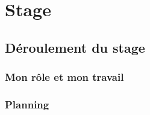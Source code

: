 \chapter{Stage}

\section{Déroulement du stage} %

\subsection{Mon rôle et mon travail}

\subsection{Planning}





